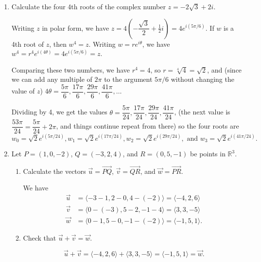 \documentclass[12pt]{article}
\newcommand{\R}{\mathbb{R}}
\begin{document}
\bigskip

\thispagestyle{fancy}

 \begin{enumerate}
 \item Calculate the four 4th roots of the complex number $z=-2\sqrt{3}+2i$.

\medskip

Writing $z$ in polar form, we have $z=4\left(-\dfrac{\sqrt{3}}{2}+\frac{1}{2}i\right) = 4e^{i(5\pi/6)}$. If $w$ is a 4th root of $z$, then $w^4=z$. Writing $w=re^{i\theta}$, we have $w^4 = r^4e^{i(4\theta)} = 4e^{i(5\pi/6)} = z$.

Comparing these two numbers, we have $r^4=4$, so $r=\sqrt[4]{4} = \sqrt{2}$, and (since we can add any multiple of $2\pi$ to the argument $5\pi/6$ without changing the value of $z$) $4\theta = \dfrac{5\pi}{6}, \dfrac{17\pi}{6}, \dfrac{29\pi}{6}, \dfrac{41\pi}{6},\ldots$

Dividing by 4, we get the values $\theta = \dfrac{5\pi}{24}, \dfrac{17\pi}{24}, \dfrac{29\pi}{24}, \dfrac{41\pi}{24}$, (the next value is $\dfrac{53\pi}{24}=\dfrac{5\pi}{24}+2\pi$, and things continue repeat from there) so the four roots are
\[
 w_0 = \sqrt{2}e^{i(5\pi/24)}, w_1 = \sqrt{2}e^{i(17\pi/24)}, w_2 = \sqrt{2}e^{i(29\pi/24)}, \text{ and } w_3 = \sqrt{2}e^{i(41\pi/24)}.
\]



 \item  Let $P=(1,0,-2)$, $Q=(-3,2,4)$, and $R=(0,5,-1)$ be points in $\R^3$.
\begin{enumerate}
 \item Calculate the vectors $\vec{u}=\overrightarrow{PQ}$, $\vec{v}=\overrightarrow{QR}$, and $\vec{w}=\overrightarrow{PR}$.

\medskip

We have 
\begin{align*}
\vec{u} & = \langle -3-1,2-0,4-(-2)\rangle = \langle -4,2,6\rangle\\
\vec{v} & = \langle 0-(-3),5-2,-1-4\rangle = \langle 3,3,-5\rangle\\
\vec{w} & = \langle 0-1, 5-0, -1-(-2)\rangle = \langle -1,5,1\rangle.
\end{align*}


 \item Check that $\vec{u}+\vec{v} = \vec{w}$.

\[
\vec{u}+\vec{v} = \langle -4,2,6\rangle+\langle 3,3,-5\rangle = \langle -1,5,1\rangle = \vec{w}.
\]


\end{enumerate}
\end{enumerate}
\end{document}

